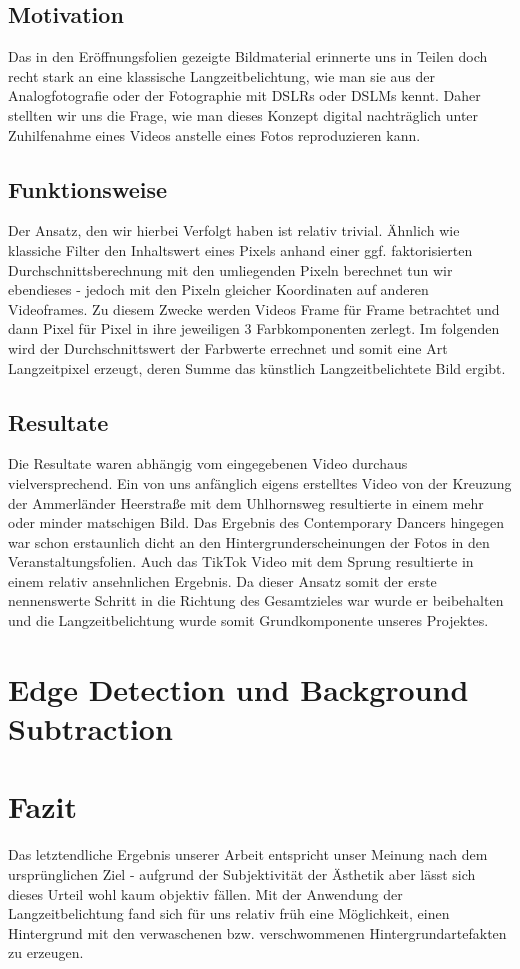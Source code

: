\documentclass[12pt]{scrartcl}
\begin{document}
\subsection{Motivation}Das in den Er\"offnungsfolien gezeigte Bildmaterial erinnerte uns in Teilen doch recht stark an eine klassische 
Langzeitbelichtung, wie 
man sie aus der Analogfotografie oder der Fotographie mit DSLRs oder DSLMs kennt. Daher stellten wir uns die Frage, wie man dieses Konzept digital nachtr\"aglich unter Zuhilfenahme eines Videos anstelle eines Fotos reproduzieren kann. \\
\subsection{Funktionsweise}Der Ansatz, den wir hierbei Verfolgt haben ist relativ trivial. \"Ahnlich wie klassiche Filter den 
Inhaltswert eines Pixels anhand einer ggf. faktorisierten Durchschnittsberechnung mit den umliegenden Pixeln berechnet tun wir ebendieses - jedoch mit den Pixeln gleicher Koordinaten auf anderen Videoframes. Zu diesem Zwecke werden Videos Frame f\"ur Frame betrachtet und dann Pixel f\"ur Pixel in ihre jeweiligen 3 Farbkomponenten zerlegt. Im folgenden wird der Durchschnittswert der Farbwerte errechnet und somit eine Art Langzeitpixel erzeugt, deren Summe das k\"unstlich Langzeitbelichtete Bild ergibt.
 \subsection{Resultate}Die Resultate waren abh\"angig vom eingegebenen Video durchaus vielversprechend. Ein von uns anf\"anglich eigens erstelltes Video von der Kreuzung der Ammerl\"ander Heerstra{\ss}e mit dem Uhlhornsweg resultierte in einem mehr oder minder matschigen Bild. Das Ergebnis des Contemporary Dancers hingegen war schon erstaunlich dicht an den Hintergrunderscheinungen der Fotos in den Veranstaltungsfolien. Auch das TikTok Video mit dem Sprung resultierte in einem relativ ansehnlichen Ergebnis. Da dieser Ansatz somit der erste nennenswerte Schritt in die Richtung des Gesamtzieles war wurde er beibehalten und die Langzeitbelichtung 
wurde somit Grundkomponente unseres Projektes.

\section{Edge Detection und Background Subtraction}

\section{Fazit}
Das letztendliche Ergebnis unserer Arbeit entspricht unser Meinung nach dem urspr\"unglichen Ziel - aufgrund der Subjektivit\"at der 
\"Asthetik aber l\"asst sich dieses Urteil wohl kaum objektiv f\"allen. Mit der Anwendung der Langzeitbelichtung fand sich f\"ur uns relativ 
fr\"uh eine M\"oglichkeit, einen Hintergrund mit den verwaschenen bzw. verschwommenen Hintergrundartefakten zu erzeugen. 
\end{document}

